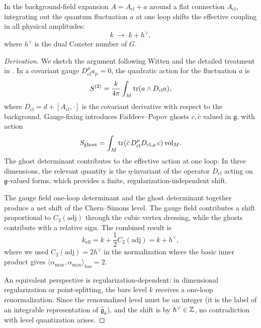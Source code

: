\begin{proposition}\label{prop:appC-level-shift}
In the background-field expansion $A = A_{\mathrm{cl}} + a$ around a flat connection $A_{\mathrm{cl}}$, integrating out the quantum fluctuation $a$ at one loop shifts the effective coupling in all physical amplitudes:
\begin{equation}\label{eq:appC-level-shift}
k \;\longrightarrow\; k + h^\vee,
\end{equation}
where $h^\vee$ is the dual Coxeter number of $G$.
\end{proposition}

\begin{proof}[Derivation]
We sketch the argument following Witten \cite{Witten1989Jones} and the detailed treatment in \cite{ElitzurMooreSchwimmerSeiberg1989}. In a covariant gauge $D_{\mathrm{cl}}^\mu a_\mu = 0$, the quadratic action for the fluctuation $a$ is
\begin{equation*}
S^{(2)} = \frac{k}{4\pi}\int_M \operatorname{tr}(a\wedge D_{\mathrm{cl}} a),
\end{equation*}
where $D_{\mathrm{cl}} = d + [A_{\mathrm{cl}},\cdot]$ is the covariant derivative with respect to the background. Gauge-fixing introduces Faddeev--Popov ghosts $c,\bar c$ valued in $\mathfrak{g}$, with action
\begin{equation*}
S_{\mathrm{ghost}} = \int_M \operatorname{tr}(\bar c\, D_{\mathrm{cl}}^\mu D_{\mathrm{cl},\mu}\, c)\,\mathrm{vol}_M.
\end{equation*}
The ghost determinant contributes to the effective action at one loop. In three dimensions, the relevant quantity is the $\eta$-invariant of the operator $D_{\mathrm{cl}}$ acting on $\mathfrak{g}$-valued forms, which provides a finite, regularization-independent shift.

The gauge field one-loop determinant and the ghost determinant together produce a net shift of the Chern--Simons level. The gauge field contributes a shift proportional to $C_2(\mathrm{adj})$ through the cubic vertex dressing, while the ghosts contribute with a relative sign. The combined result is
\begin{equation*}
k_{\mathrm{eff}} = k + \frac{1}{2}C_2(\mathrm{adj}) = k + h^\vee,
\end{equation*}
where we used $C_2(\mathrm{adj}) = 2h^\vee$ in the normalization where the basic inner product gives $\langle\alpha_{\max},\alpha_{\max}\rangle_{\mathrm{bas}} = 2$.

An equivalent perspective is regularization-dependent: in dimensional regularization or point-splitting, the bare level $k$ receives a one-loop renormalization. Since the renormalized level must be an integer (it is the label of an integrable representation of $\hat{\mathfrak{g}}_k$), and the shift is by $h^\vee\in \mathbb{Z}$, no contradiction with level quantization arises.
\end{proof}

